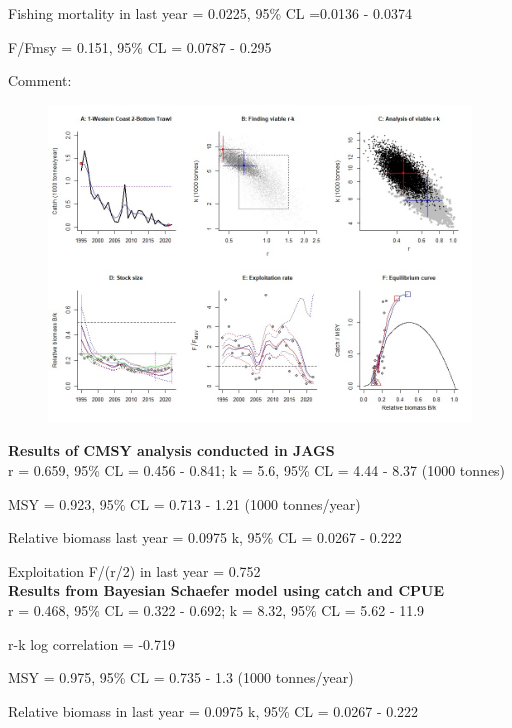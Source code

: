 \documentclass[12pt,a4paper]{article}\usepackage[]{graphicx}\usepackage[]{xcolor}
\begin{document}
Fishing mortality in last year = 0.0225, 95\% CL =0.0136 - 0.0374

F/Fmsy  = 0.151, 95\% CL = 0.0787 - 0.295 

 Comment:  

    \pagebreak

    \begin{figure}[ht]
    \centering
    \includegraphics[width=1.00\textwidth ext=.jpg type=jpg]{1-Western Coast 2-Bottom Trawl_AN.jpg}
    \end{figure}

    \textbf{Results of CMSY analysis conducted in JAGS}\\

r = 0.659, 95\% CL = 0.456 - 0.841; k = 5.6, 95\% CL = 4.44 - 8.37 (1000 tonnes)

MSY = 0.923, 95\% CL = 0.713 - 1.21 (1000 tonnes/year)

Relative biomass last year = 0.0975 k, 95\% CL = 0.0267 - 0.222

Exploitation F/(r/2) in last year = 0.752 \\

\textbf{Results from Bayesian Schaefer model using catch and CPUE}\\

r = 0.468, 95\% CL = 0.322 - 0.692; k = 8.32, 95\% CL = 5.62 - 11.9

r-k log correlation = -0.719

MSY = 0.975, 95\% CL = 0.735 - 1.3 (1000 tonnes/year)

Relative biomass in last year = 0.0975 k, 95\% CL = 0.0267 - 0.222
\end{document}
